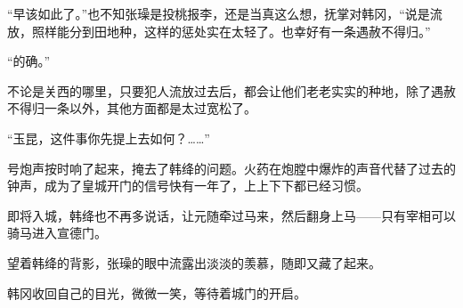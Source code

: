 “早该如此了。”也不知张璪是投桃报李，还是当真这么想，抚掌对韩冈，“说是流放，照样能分到田地种，这样的惩处实在太轻了。也幸好有一条遇赦不得归。”

“的确。”

不论是关西的哪里，只要犯人流放过去后，都会让他们老老实实的种地，除了遇赦不得归一条以外，其他方面都是太过宽松了。

“玉昆，这件事你先提上去如何？……”

号炮声按时响了起来，掩去了韩绛的问题。火药在炮膛中爆炸的声音代替了过去的钟声，成为了皇城开门的信号快有一年了，上上下下都已经习惯。

即将入城，韩绛也不再多说话，让元随牵过马来，然后翻身上马——只有宰相可以骑马进入宣德门。

望着韩绛的背影，张璪的眼中流露出淡淡的羡慕，随即又藏了起来。

韩冈收回自己的目光，微微一笑，等待着城门的开启。
